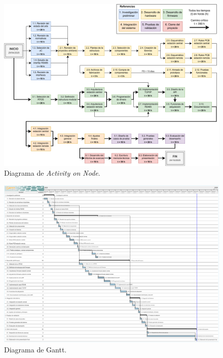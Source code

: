 \documentclass[
11pt, %
]{charter}
\begin{document}
\begin{landscape}
	\begin{figure}[htpb]
		\centering 
		\includegraphics[height=\textheight]{./Figuras/diagAoN.pdf}
		\caption{Diagrama de \textit{Activity on Node}.}
		\label{fig:diagAoN}
	\end{figure}
\end{landscape}

\begin{landscape}
\begin{figure}[htpb]
\centering 
\includegraphics[height=\textheight]{./Figuras/diagGanttv4.0.pdf}
\caption{Diagrama de Gantt.}
\label{fig:diagGantt}
\end{figure}

\end{landscape}
\end{document}
